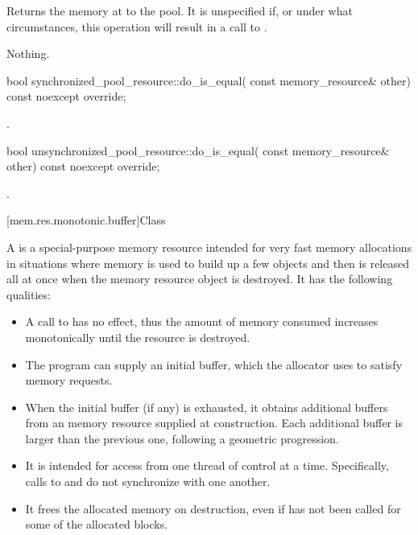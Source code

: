 \begin{itemdescr}
\pnum
\effects
Returns the memory at  to the pool.
It is unspecified if, or under what circumstances,
this operation will result in a call to .

\pnum
\throws
Nothing.
\end{itemdescr}

%
\begin{itemdecl}
bool synchronized_pool_resource::do_is_equal(
    const memory_resource& other) const noexcept override;
\end{itemdecl}

\begin{itemdescr}
\pnum
\returns
{}.
\end{itemdescr}

%
\begin{itemdecl}
bool unsynchronized_pool_resource::do_is_equal(
    const memory_resource& other) const noexcept override;
\end{itemdecl}

\begin{itemdescr}
\pnum
\returns
{}.
\end{itemdescr}

[mem.res.monotonic.buffer]{Class }

\pnum
A  is a special-purpose memory resource
intended for very fast memory allocations in situations
where memory is used to build up a few objects
and then is released all at once when the memory resource object is destroyed.
It has the following qualities:
\begin{itemize}
\item
A call to  has no effect,
thus the amount of memory consumed increases monotonically
until the resource is destroyed.
\item
The program can supply an initial buffer,
which the allocator uses to satisfy memory requests.
\item
When the initial buffer (if any) is exhausted,
it obtains additional buffers from an  memory resource
supplied at construction.
Each additional buffer is larger than the previous one,
following a geometric progression.
\item
It is intended for access from one thread of control at a time.
Specifically, calls to  and 
do not synchronize with one another.
\item
It frees the allocated memory on destruction,
even if  has not been called for some of the allocated blocks.
\end{itemize}

